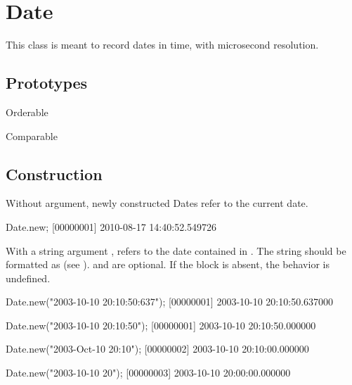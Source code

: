 
\section{Date}

This class is meant to record dates in time, with microsecond resolution.
\experimental{}

\subsection{Prototypes}
\begin{refObjects}
\item[Orderable]
\item[Comparable]
\end{refObjects}

\subsection{Construction}

Without argument, newly constructed Dates refer to the current date.

\begin{urbiunchecked}[firstnumber=1]
Date.new;
[00000001] 2010-08-17 14:40:52.549726
\end{urbiunchecked}

With a string argument , refers to the date contained in .
The string should be formatted as  (see ).  and
 are optional. If the block  is
absent, the behavior is undefined.

\begin{urbiscript}
Date.new("2003-10-10 20:10:50:637");
[00000001] 2003-10-10 20:10:50.637000

Date.new("2003-10-10 20:10:50");
[00000001] 2003-10-10 20:10:50.000000

Date.new("2003-Oct-10 20:10");
[00000002] 2003-10-10 20:10:00.000000

Date.new("2003-10-10 20");
[00000003] 2003-10-10 20:00:00.000000
\end{urbiscript}


